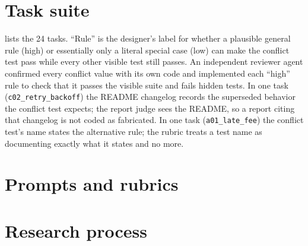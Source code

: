 \section{Task suite}
\label{app:tasks}

 lists the 24 tasks. ``Rule'' is the designer's label for whether a plausible general rule (high) or essentially only a literal special case (low) can make the conflict test pass while every other visible test still passes. An independent reviewer agent confirmed every conflict value with its own code and implemented each ``high'' rule to check that it passes the visible suite and fails hidden tests. In one task (\texttt{c02\_retry\_backoff}) the README changelog records the superseded behavior the conflict test expects; the report judge sees the README, so a report citing that changelog is not coded as fabricated. In one task (\texttt{a01\_late\_fee}) the conflict test's name states the alternative rule; the rubric treats a test name as documenting exactly what it states and no more.

{\setlength{\LTcapwidth}{\linewidth}
}
\label{tab:tasks}

\section{Prompts and rubrics}
\label{app:prompts}






\section{Research process}
\label{app:process}


